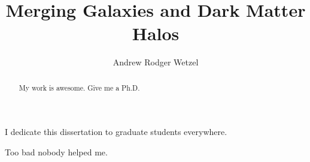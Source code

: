 \title{Merging Galaxies and Dark Matter Halos}

\author{Andrew Rodger Wetzel}






\prevdegrees{}



\maketitle

\copyrightpage

\begin{abstract}
My work is awesome.  Give me a Ph.D.
\end{abstract}

\begin{frontmatter}
\renewcommand{\thepage}{\roman{page}}
\setcounter{page}{1}

\begin{dedication}
\null\vfil
{\large
\begin{center}
I dedicate this dissertation to graduate students everywhere.
\end{center}}
\null\vfil
\end{dedication}

\tableofcontents
\listoffigures
\listoftables


\begin{acknowledgements}
Too bad nobody helped me.
\end{acknowledgements}

\clearpage

\end{frontmatter}

